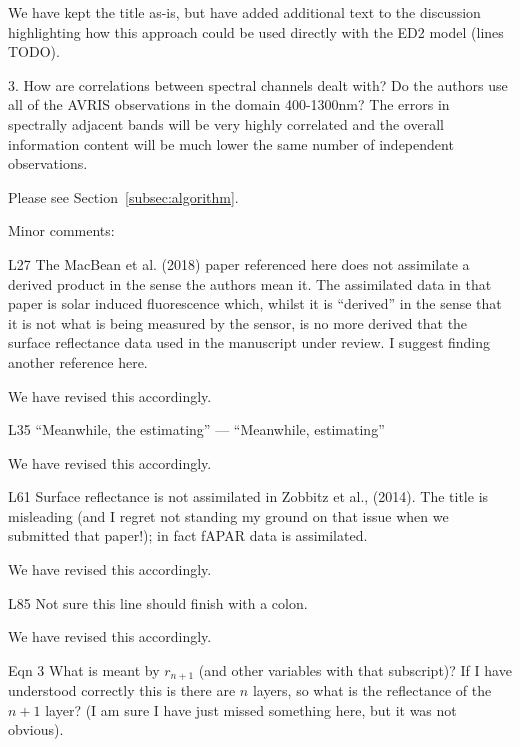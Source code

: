 We have kept the title as-is, but have added additional text to the discussion highlighting how this approach could be used directly with the ED2 model (lines TODO).

\begin{reviewer}
  3. How are correlations between spectral channels dealt with? Do the authors use all of the AVRIS observations in the domain 400-1300nm? The errors in spectrally adjacent bands will be very highly correlated and the overall information content will be much lower the same number of independent observations.
\end{reviewer}

Please see Section~\ref{subsec:algorithm}.

\begin{reviewer}
Minor comments:

L27 The MacBean et al. (2018) paper referenced here does not assimilate a derived product in the sense the authors mean it. The assimilated data in that paper is solar induced fluorescence which, whilst it is “derived” in the sense that it is not what is being measured by the sensor, is no more derived that the surface reflectance data used in the manuscript under review. I suggest finding another reference here.
\end{reviewer}

We have revised this accordingly.

\begin{reviewer}
L35 “Meanwhile, the estimating” --- “Meanwhile, estimating”
\end{reviewer}

We have revised this accordingly.

\begin{reviewer}
L61 Surface reflectance is not assimilated in Zobbitz et al., (2014). The title is misleading (and I regret not standing my ground on that issue when we submitted that paper!); in fact fAPAR data is assimilated.
\end{reviewer}

We have revised this accordingly.

\begin{reviewer}
L85 Not sure this line should finish with a colon.
\end{reviewer}

We have revised this accordingly.

\begin{reviewer}
Eqn 3 What is meant by $r_{n+1}$ (and other variables with that subscript)? If I have understood correctly this is there are $n$ layers, so what is the reflectance of the $n + 1$ layer? (I am sure I have just missed something here, but it was not obvious).
\end{reviewer}

